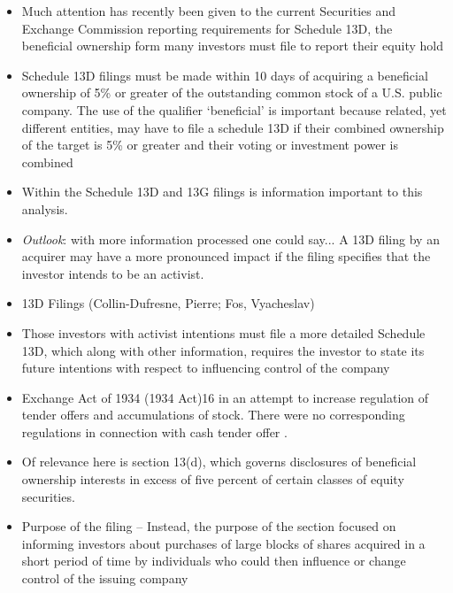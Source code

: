 \documentclass[12pt]{article}
\begin{document}
    \begin{itemize}
        \item Much attention has recently been given to the current Securities and Exchange Commission reporting requirements for Schedule 13D, the beneficial ownership form many investors must file to report their equity hold \citep{Giglia2018}

        \item Schedule 13D filings must be made within 10 days of acquiring a beneficial ownership of 5\% or greater of the outstanding common stock of a U.S. public company. The use of the qualifier ‘beneficial’ is important because related, yet different entities, may have to file a schedule 13D if their combined ownership of the target is 5\% or greater and their voting or investment power is combined \citep{Brigida2012}

        \item Within the Schedule 13D and 13G filings is information important to this analysis. \citep{Brigida2012}

        \item \emph{Outlook}: with more information processed one could say... A 13D filing by an acquirer may have a more pronounced impact if the filing specifies that the investor intends to be an activist. \citep{Brigida2012}

        \item 13D Filings (Collin-Dufresne, Pierre; Fos, Vyacheslav)

        \item Those investors with activist intentions must file a more detailed Schedule 13D, which along with other information, requires the investor to state its future intentions with respect to influencing control of the company \citep{Giglia2018}

        \item Exchange Act of 1934 (1934 Act)16 in an attempt to increase regulation of tender offers and accumulations of stock. There were no corresponding regulations in connection with cash tender offer \citep{Giglia2018}.

        \item Of relevance here is section 13(d), which governs disclosures of beneficial ownership interests in excess of five percent of certain classes of equity securities. 

        \item Purpose of the filing -- Instead, the purpose of the section focused on informing investors about purchases of large blocks of shares acquired in a short period of time by individuals who could then influence or change control of the issuing company \citep{Giglia2018}


\end{itemize}
\end{document}
